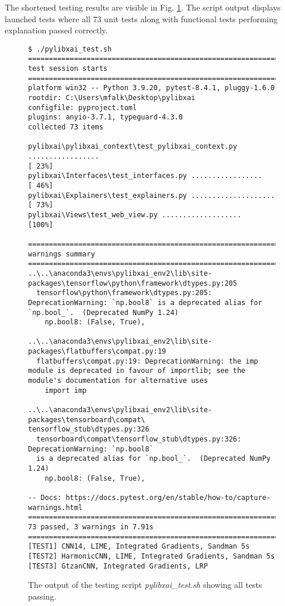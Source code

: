\documentclass[
    bindingoffset=5mm,  %
    footnoteindent=3mm, %
    hyphenation=true    %
]{src/wut-thesis}
\begin{document}
The shortened testing results are visible in Fig. \ref{fig:TestingScriptOutput}.
The script output displays launched tests where all 73 unit tests along with functional
tests performing explanation passed correctly.

\begin{figure}%
\begin{verbatim}
$ ./pylibxai_test.sh
======================================================================== test session starts =========================================================================
platform win32 -- Python 3.9.20, pytest-8.4.1, pluggy-1.6.0
rootdir: C:\Users\mfalk\Desktop\pylibxai
configfile: pyproject.toml
plugins: anyio-3.7.1, typeguard-4.3.0
collected 73 items

pylibxai\pylibxai_context\test_pylibxai_context.py .................                                                                                            [ 23%]
pylibxai\Interfaces\test_interfaces.py .................                                                                                                        [ 46%]
pylibxai\Explainers\test_explainers.py ....................                                                                                                     [ 73%]
pylibxai\Views\test_web_view.py ...................                                                                                                             [100%]

========================================================================== warnings summary ==========================================================================
..\..\anaconda3\envs\pylibxai_env2\lib\site-packages\tensorflow\python\framework\dtypes.py:205
  tensorflow\python\framework\dtypes.py:205: DeprecationWarning: `np.bool8` is a deprecated alias for `np.bool_`.  (Deprecated NumPy 1.24)
    np.bool8: (False, True),

..\..\anaconda3\envs\pylibxai_env2\lib\site-packages\flatbuffers\compat.py:19
  flatbuffers\compat.py:19: DeprecationWarning: the imp module is deprecated in favour of importlib; see the module's documentation for alternative uses
    import imp

..\..\anaconda3\envs\pylibxai_env2\lib\site-packages\tensorboard\compat\
tensorflow_stub\dtypes.py:326
  tensorboard\compat\tensorflow_stub\dtypes.py:326: DeprecationWarning: `np.bool8`
  is a deprecated alias for `np.bool_`.  (Deprecated NumPy 1.24)
    np.bool8: (False, True),

-- Docs: https://docs.pytest.org/en/stable/how-to/capture-warnings.html
=================================================================== 73 passed, 3 warnings in 7.91s ===================================================================
[TEST1] CNN14, LIME, Integrated Gradients, Sandman 5s
[TEST2] HarmonicCNN, LIME, Integrated Gradients, Sandman 5s
[TEST3] GtzanCNN, Integrated Gradients, LRP
\end{verbatim}
\caption{The output of the testing script \emph{pylibxai\_test.sh} showing all tests passing.}
\label{fig:TestingScriptOutput}
\end{figure}
\end{document}
